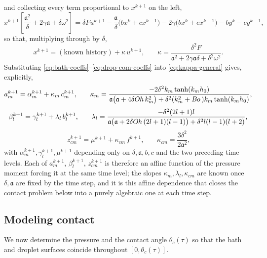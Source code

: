 and collecting every term proportional to $x^{k+1}$ on the left,
\begin{equation}
    x^{k+1}\left[\frac{\mathfrak a^2}{\delta}+2\gamma\mathfrak a+\delta\omega^2\right]
    = \delta Fu^{k+1} - \frac{\mathfrak a}{\delta}\big(bx^k+cx^{k-1}\big)-2\gamma\big(bx^k+cx^{k-1}\big)-by^k-cy^{k-1}\text{,}
\end{equation}
so that, multiplying through by $\delta$,
\begin{equation}
    x^{k+1} = (\text{known history}) + \kappa\,u^{k+1}\text{,}\qquad
    \kappa = \frac{\delta^2 F}{\mathfrak a^2+2\gamma\mathfrak a\delta+\delta^2\omega^2}\text{.}
    \label{eq:kappa-general}
\end{equation}
Substituting \eqref{eq:bath-coeffs}--\eqref{eq:drop-com-coeffs} into \eqref{eq:kappa-general} gives, explicitly,
\begin{equation}
    a_m^{k+1} = \alpha_m^{k+1} + \kappa_m\, c_m^{k+1}\text{,}\qquad
    \kappa_m = \frac{-2\delta^2 k_m\tanh(k_mh_0)}{\mathfrak a\big(\mathfrak a+4\delta O\kern-0.04em h\, k_m^2\big)+\delta^2(k_m^2+B\kern-0.04em o\,)k_m\tanh(k_mh_0)}\text{,}
    \label{eq:kappa-m}
\end{equation}
\begin{equation}
    \beta_l^{k+1} = \gamma_l^{k+1} + \lambda_l\, b_l^{k+1}\text{,}\qquad
    \lambda_l = \frac{-\delta^2(2l+1)l}{\mathfrak a\big(\mathfrak a+2\delta O\kern-0.04em h\,(2l+1)(l-1)\big)+\delta^2l(l-1)(l+2)}\text{,}
    \label{eq:lambda-l}
\end{equation}
\begin{equation}
    z_{cm}^{k+1} = \mu^{k+1}+\kappa_{cm}\,f^{k+1}\text{,}\qquad \kappa_{cm}=\frac{3\delta^2}{2\mathfrak a^2}\text{,}
    \label{eq:kappa-cm}
\end{equation}
with $\alpha_m^{k+1},\gamma_l^{k+1},\mu^{k+1}$ depending only on $\delta,\mathfrak a,b,c$ and the two preceding time levels. Each of $a_m^{k+1}$, $\beta_l^{k+1}$, $z_{cm}^{k+1}$ is therefore an affine function of the pressure moment forcing it at the same time level; the slopes $\kappa_m,\lambda_l,\kappa_{cm}$ are known once $\delta,\mathfrak a$ are fixed by the time step, and it is this affine dependence that closes the contact problem below into a purely algebraic one at each time step.

\subsection{Modeling contact}
\label{subsec:contact}

\hspace*{1em}We now determine the pressure and the contact angle $\theta_c(\tau)$ so that the bath and droplet surfaces coincide throughout $[0,\theta_c(\tau)]$.

